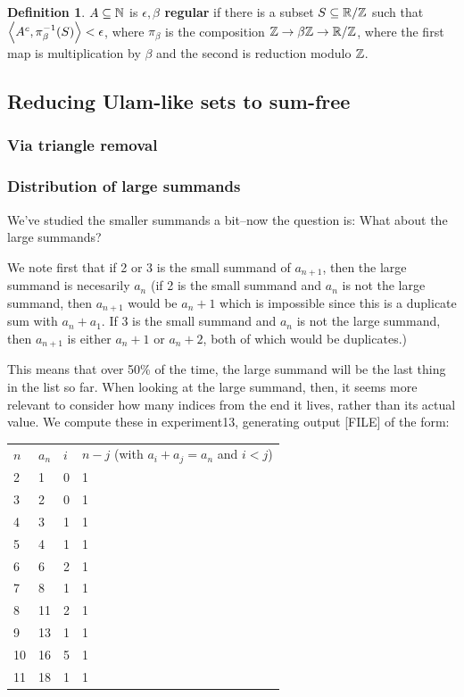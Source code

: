 \documentclass{article}
\theoremstyle{definition}
\newtheorem{definition}{Definition}
\theoremstyle{remark}
\numberwithin{equation}{section}
\begin{document}
{\begin{definition}$A \subseteq \mathbb{N}$ is \textbf{$\epsilon, \beta$ regular}
  if there is a subset $S \subseteq \mathbb{R}/\mathbb{Z}$ such that
  $\left<A^c, \pi_\beta^{-1}(S)\right> < \epsilon$, where $\pi_\beta$ is the
  composition $\mathbb{Z} \to \beta\mathbb{Z} \to \mathbb{R}/\mathbb{Z}$, where the first map is
  multiplication by $\beta$ and the second is reduction modulo $\mathbb{Z}$.
\end{definition}

\subsection{Reducing Ulam-like sets to sum-free}

\subsubsection{Via triangle removal}
\subsubsection{Distribution of large summands}
We've studied the smaller summands a bit--now the question is: What
about the large summands?

We note first that if 2 or 3 is the small summand of $a_{n+1}$, then
the large summand is necesarily $a_n$ (if 2 is the small summand and
$a_n$ is not the large summand, then $a_{n+1}$ would be $a_n + 1$
which is impossible since this is a duplicate sum with $a_n+a_1$.  If
3 is the small summand and $a_n$ is not the large summand, then
$a_{n+1}$ is either $a_n + 1$ or $a_n + 2$, both of which would be
duplicates.)

This means that over 50\% of the time, the large summand will be the
last thing in the list so far.  When looking at the large summand,
then, it seems more relevant to consider how many indices from the end
it lives, rather than its actual value.  We compute these in
experiment13, generating output [FILE] of the form:

\begin{tabular}{|l|l|l|l|}
$n$ 	&$a_n$	&$i$	&$n-j$ (with $a_i + a_j = a_n$ and $i < j$)\\
2 	&1 	&0 	&1\\
3 	&2 	&0 	&1\\
4 	&3 	&1 	&1\\
5 	&4 	&1 	&1\\
6 	&6 	&2 	&1\\
7 	&8 	&1 	&1\\
8 	&11 	&2 	&1\\
9 	&13 	&1 	&1\\
10 	&16 	&5 	&1\\
11 	&18 	&1 	&1
\end{tabular}

}
\end{document}
